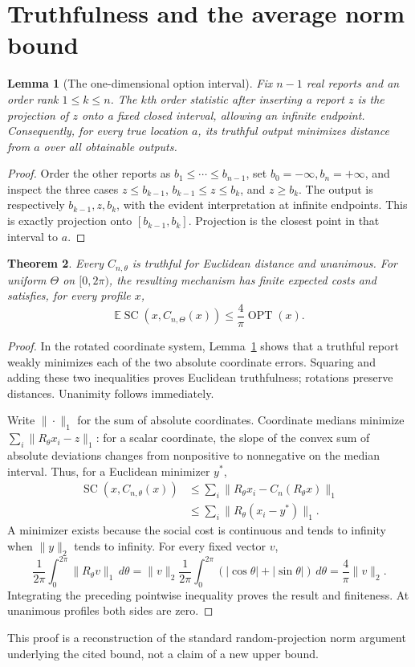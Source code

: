 \documentclass[11pt]{article}
\newtheorem{theorem}{Theorem}
\newtheorem{lemma}[theorem]{Lemma}
\theoremstyle{definition}
\newcommand{\E}{\mathbb E}
\DeclareMathOperator{\SC}{SC}
\DeclareMathOperator{\OPT}{OPT}
\begin{document}
\section{Truthfulness and the average norm bound}
\begin{lemma}[The one-dimensional option interval]\label{clamp}
Fix $n-1$ real reports and an order rank $1\le k\le n$. The $k$th
order statistic after inserting a report $z$ is the projection of $z$
onto a fixed closed interval, allowing an infinite endpoint. Consequently,
for every true location $a$, its truthful output minimizes distance from
$a$ over all obtainable outputs.
\end{lemma}
\begin{proof}
Order the other reports as $b_1\le\cdots\le b_{n-1}$, set
$b_0=-\infty,b_n=+\infty$, and inspect the three cases
$z\le b_{k-1}$, $b_{k-1}\le z\le b_k$, and $z\ge b_k$.
The output is respectively $b_{k-1},z,b_k$, with the evident interpretation
at infinite endpoints. This is exactly projection onto $[b_{k-1},b_k]$.
Projection is the closest point in that interval to $a$.
\end{proof}
\begin{theorem}\label{upper}
Every $C_{n,\theta}$ is truthful for Euclidean distance and unanimous.
For uniform $\Theta$ on $[0,2\pi)$, the resulting mechanism has finite
expected costs and satisfies, for every profile $x$,
\[
 \E\SC(x,C_{n,\Theta}(x))\le\frac4\pi\OPT(x).
\]
\end{theorem}
\begin{proof}
In the rotated coordinate system, Lemma~\ref{clamp} shows that a truthful
report weakly minimizes each of the two absolute coordinate errors.
Squaring and adding these two inequalities proves Euclidean truthfulness;
rotations preserve distances. Unanimity follows immediately.

Write $\|\cdot\|_1$ for the sum of absolute coordinates. Coordinate medians
minimize $\sum_i\|R_\theta x_i-z\|_1$: for a scalar coordinate, the slope
of the convex sum of absolute deviations changes from nonpositive to
nonnegative on the median interval. Thus, for a Euclidean minimizer $y^*$,
\begin{align*}
 \SC(x,C_{n,\theta}(x))
 &\le\sum_i\|R_\theta x_i-C_n(R_\theta x)\|_1\\
 &\le\sum_i\|R_\theta(x_i-y^*)\|_1.
\end{align*}
A minimizer exists because the social cost is continuous and tends to
infinity when $\|y\|_2$ tends to infinity. For every fixed vector $v$,
\[
 \frac1{2\pi}\int_0^{2\pi}\|R_\theta v\|_1\,d\theta
 =\|v\|_2\frac1{2\pi}\int_0^{2\pi}
 (|\cos\theta|+|\sin\theta|)\,d\theta
 =\frac4\pi\|v\|_2.
\]
Integrating the preceding pointwise inequality proves the result and
finiteness. At unanimous profiles both sides are zero.
\end{proof}
This proof is a reconstruction of the standard random-projection norm
argument underlying the cited bound, not a claim of a new upper bound.
\end{document}
